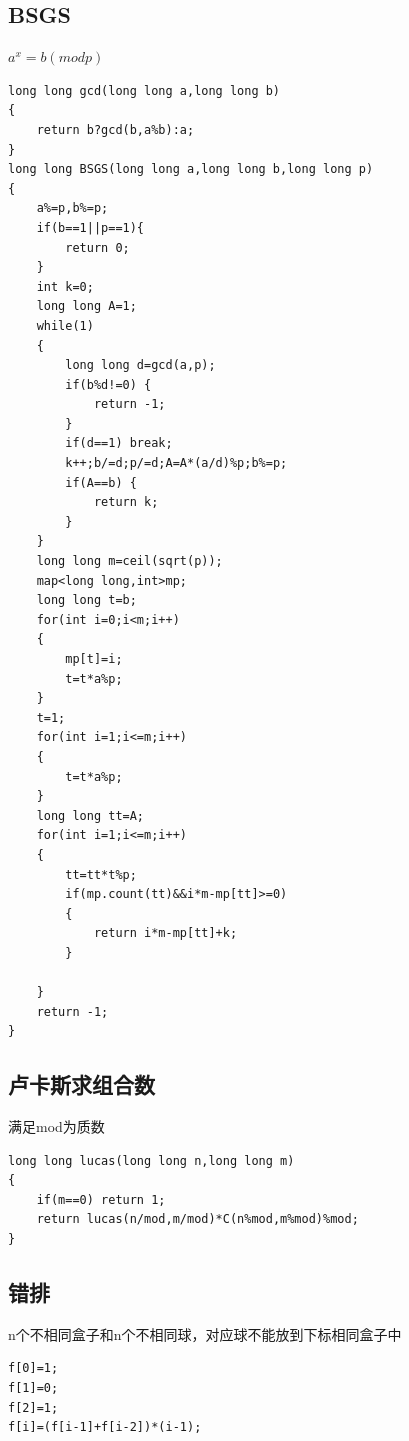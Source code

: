 \documentclass[12pt, a4paper, oneside]{ctexart}
\begin{document}
\newpage 
\subsection{BSGS} 
${a^x=b(mod p)}$
\begin{lstlisting}
long long gcd(long long a,long long b)
{
	return b?gcd(b,a%b):a;
}
long long BSGS(long long a,long long b,long long p)
{
	a%=p,b%=p;
	if(b==1||p==1){
		return 0;
	}
	int k=0;
	long long A=1;
	while(1)
	{
		long long d=gcd(a,p);
		if(b%d!=0) {
			return -1;
		}
		if(d==1) break;
		k++;b/=d;p/=d;A=A*(a/d)%p;b%=p;
		if(A==b) {
			return k;
		}
	}
	long long m=ceil(sqrt(p));
	map<long long,int>mp;
	long long t=b;
	for(int i=0;i<m;i++)
	{
		mp[t]=i;
		t=t*a%p;
	}
	t=1;
	for(int i=1;i<=m;i++)
	{
		t=t*a%p;
	}
	long long tt=A;
	for(int i=1;i<=m;i++)
	{
		tt=tt*t%p;
		if(mp.count(tt)&&i*m-mp[tt]>=0)
		{
			return i*m-mp[tt]+k;
		}
		
	}
	return -1;
}
\end{lstlisting}

\newpage 
\subsection{卢卡斯求组合数} 
满足mod为质数
\begin{lstlisting}
long long lucas(long long n,long long m)
{
	if(m==0) return 1;
	return lucas(n/mod,m/mod)*C(n%mod,m%mod)%mod;
}
\end{lstlisting}

\newpage 
\subsection{错排} 
n个不相同盒子和n个不相同球，对应球不能放到下标相同盒子中
\begin{lstlisting}
f[0]=1;
f[1]=0;
f[2]=1;
f[i]=(f[i-1]+f[i-2])*(i-1);
\end{lstlisting}

\newpage 
\end{document}
